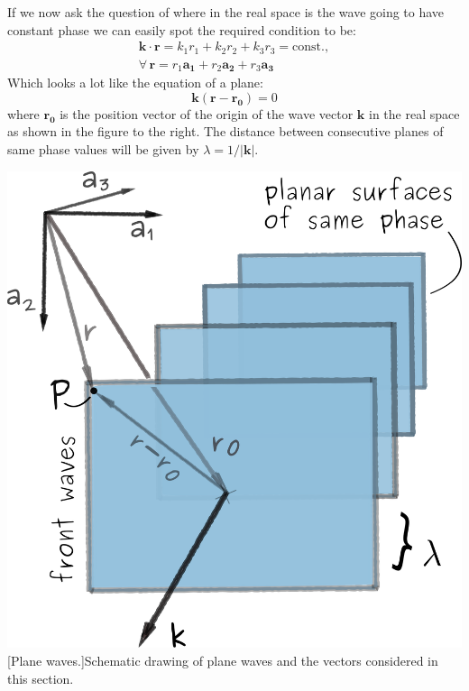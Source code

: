 \vspace{0.3cm}
\noindent \begin{minipage}{0.6\textwidth}
If we now ask the question of where in the real space is the wave going to have constant phase we can easily spot the required condition to be:
\begin{multline*}
\mathbf{k} \cdot \mathbf{r} = k_1 r_1 + k_2 r_2 + k_3 r_3 = \textrm{const.} , \\
\forall \, \mathbf{r} = r_1 \mathbf{a_1} + r_2 \mathbf{a_2} + r_3 \mathbf{a_3}
\end{multline*}
Which looks a lot like the equation of a plane:%
$$\mathbf{k}(\mathbf{r}-\mathbf{r_0}) = 0 $$
where $\mathbf{r_0}$ is the position vector of the origin of the wave vector $\mathbf{k}$ in the real space as shown in the figure to the right. The distance between consecutive planes of same phase values will be given by $\lambda = 1/|\mathbf{k}|$.

\end{minipage}
\begin{minipage}{0.4\textwidth}
\centering
\captionsetup{width=.7\linewidth}
\includegraphics[width=1\linewidth]{Figures/planeWaves.png}
[Plane waves.]{Schematic drawing of plane waves and the vectors considered in this section.}
\label{Fig:planeWaves}

\end{minipage}

